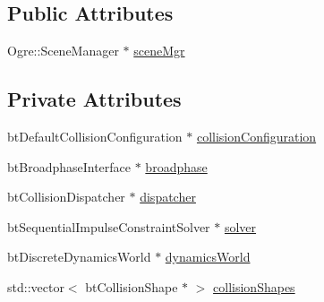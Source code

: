 \subsection*{Public Attributes}
\begin{DoxyCompactItemize}
\item 
Ogre\-::\-Scene\-Manager $\ast$ \hyperlink{classSimulator_ab5748cbb0ec57cd4922d2e88766fb8a2}{scene\-Mgr}
\end{DoxyCompactItemize}
\subsection*{Private Attributes}
\begin{DoxyCompactItemize}
\item 
bt\-Default\-Collision\-Configuration $\ast$ \hyperlink{classSimulator_ae128785e92d1f8cac37b7008ff6c0cf7}{collision\-Configuration}
\item 
bt\-Broadphase\-Interface $\ast$ \hyperlink{classSimulator_abf328154008d231ebff7a42a58791e5b}{broadphase}
\item 
bt\-Collision\-Dispatcher $\ast$ \hyperlink{classSimulator_af84d7e00b1ee5bcade4e40847eea3fd4}{dispatcher}
\item 
bt\-Sequential\-Impulse\-Constraint\-Solver $\ast$ \hyperlink{classSimulator_a2da0915f8ba415561a147b72659ef17a}{solver}
\item 
bt\-Discrete\-Dynamics\-World $\ast$ \hyperlink{classSimulator_a287d65d2e05fece22279b022886292ef}{dynamics\-World}
\item 
std\-::vector$<$ bt\-Collision\-Shape $\ast$ $>$ \hyperlink{classSimulator_a76a5f71d55dd786819ab1240e5a45791}{collision\-Shapes}
\end{DoxyCompactItemize}



